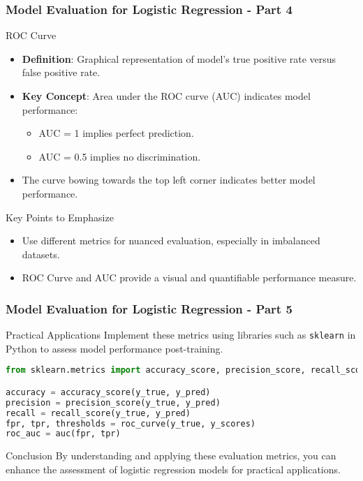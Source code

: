 \documentclass[aspectratio=169]{beamer}
\begin{document}
\begin{frame}[fragile]
    \frametitle{Model Evaluation for Logistic Regression - Part 4}

    \begin{block}{ROC Curve}
        \begin{itemize}
            \item \textbf{Definition}: Graphical representation of model's true positive rate versus false positive rate.
            \item \textbf{Key Concept}: Area under the ROC curve (AUC) indicates model performance:
            \begin{itemize}
                \item AUC = 1 implies perfect prediction.
                \item AUC = 0.5 implies no discrimination.
            \end{itemize}
            \item The curve bowing towards the top left corner indicates better model performance.
        \end{itemize}
    \end{block}

    \begin{block}{Key Points to Emphasize}
        \begin{itemize}
            \item Use different metrics for nuanced evaluation, especially in imbalanced datasets.
            \item ROC Curve and AUC provide a visual and quantifiable performance measure.
        \end{itemize}
    \end{block}
\end{frame}

\begin{frame}[fragile]
    \frametitle{Model Evaluation for Logistic Regression - Part 5}

    \begin{block}{Practical Applications}
        Implement these metrics using libraries such as \texttt{sklearn} in Python to assess model performance post-training.
        \begin{lstlisting}[language=Python]
from sklearn.metrics import accuracy_score, precision_score, recall_score, roc_curve, auc

accuracy = accuracy_score(y_true, y_pred)
precision = precision_score(y_true, y_pred)
recall = recall_score(y_true, y_pred)
fpr, tpr, thresholds = roc_curve(y_true, y_scores)
roc_auc = auc(fpr, tpr)
        \end{lstlisting}
    \end{block}

    \begin{block}{Conclusion}
        By understanding and applying these evaluation metrics, you can enhance the assessment of logistic regression models for practical applications.
    \end{block}
\end{frame}
\end{document}
